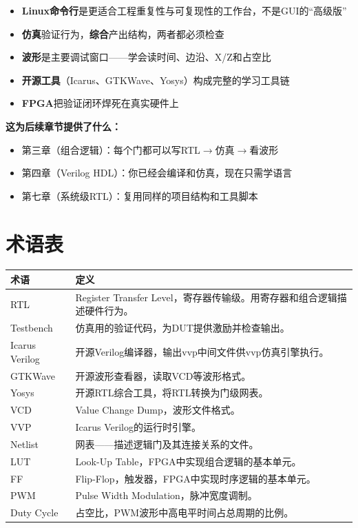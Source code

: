 \documentclass[11pt,a4paper]{article}
\begin{document}
\begin{itemize}
  \item \textbf{Linux命令行}是更适合工程重复性与可复现性的工作台，不是GUI的``高级版''
  \item \textbf{仿真}验证行为，\textbf{综合}产出结构，两者都必须检查
  \item \textbf{波形}是主要调试窗口——学会读时间、边沿、X/Z和占空比
  \item \textbf{开源工具}（Icarus、GTKWave、Yosys）构成完整的学习工具链
  \item \textbf{FPGA}把验证闭环焊死在真实硬件上
\end{itemize}

\textbf{这为后续章节提供了什么：}
\begin{itemize}
  \item 第三章（组合逻辑）：每个门都可以写RTL$\rightarrow$仿真$\rightarrow$看波形
  \item 第四章（Verilog HDL）：你已经会编译和仿真，现在只需学语言
  \item 第七章（系统级RTL）：复用同样的项目结构和工具脚本
\end{itemize}

\section{术语表}

\begin{center}
\begin{tabular}{lp{10cm}}
\toprule
\textbf{术语} & \textbf{定义} \\
\midrule
RTL & Register Transfer Level，寄存器传输级。用寄存器和组合逻辑描述硬件行为。 \\
Testbench & 仿真用的验证代码，为DUT提供激励并检查输出。 \\
Icarus Verilog & 开源Verilog编译器，输出vvp中间文件供vvp仿真引擎执行。 \\
GTKWave & 开源波形查看器，读取VCD等波形格式。 \\
Yosys & 开源RTL综合工具，将RTL转换为门级网表。 \\
VCD & Value Change Dump，波形文件格式。 \\
VVP & Icarus Verilog的运行时引擎。 \\
Netlist & 网表——描述逻辑门及其连接关系的文件。 \\
LUT & Look-Up Table，FPGA中实现组合逻辑的基本单元。 \\
FF & Flip-Flop，触发器，FPGA中实现时序逻辑的基本单元。 \\
PWM & Pulse Width Modulation，脉冲宽度调制。 \\
Duty Cycle & 占空比，PWM波形中高电平时间占总周期的比例。 \\
\bottomrule
\end{tabular}
\end{center}
\end{document}
